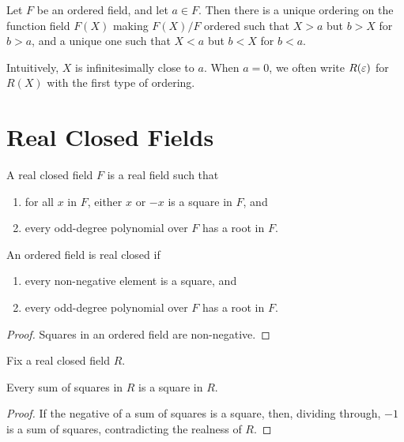 \begin{lemma}
  \label{lem:order_fun_field}
  Let $F$ be an ordered field, and let $a\in F$. Then there is a unique ordering on the function field $F(X)$ making $F(X)/F$ ordered such that $X>a$ but $b>X$ for $b>a$, and a unique one such that $X<a$ but $b<X$ for $b<a$.
\end{lemma}

Intuitively, $X$ is infinitesimally close to $a$. When $a=0$, we often write $R(\varepsilon)$ for $R(X)$ with the first type of ordering.

\section{Real Closed Fields}

\begin{definition}
  \label{def:RCF}
  \leanok
  A real closed field $F$ is a real field such that
  \begin{enumerate}
    \item for all $x$ in $F$, either $x$ or $-x$ is a square in $F$, and
    \item every odd-degree polynomial over $F$ has a root in $F$.
  \end{enumerate}
\end{definition}

\begin{lemma}
  \label{lem:RCF_ord_ax}
  \leanok
  An ordered field is real closed if
  \begin{enumerate}
    \item every non-negative element is a square, and
    \item every odd-degree polynomial over $F$ has a root in $F$.
  \end{enumerate}
\end{lemma}
\begin{proof}
  \leanok
  Squares in an ordered field are non-negative.
\end{proof}

Fix a real closed field $R$.

\begin{lemma}
  \label{lem:RCF_sumsq_is_sq}
  \leanok
  Every sum of squares in $R$ is a square in $R$.
\end{lemma}
\begin{proof}
  \leanok
  If the negative of a sum of squares is a square, then, dividing through, $-1$ is a sum of squares, contradicting the realness of $R$.
\end{proof}

